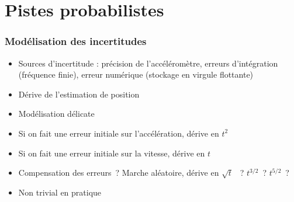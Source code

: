 \documentclass[11pt]{beamer}
\begin{document}
\section{Pistes probabilistes}
\begin{frame}
  \frametitle{Modélisation des incertitudes}
\begin{itemize}
\item Sources d'incertitude : précision de l'accéléromètre, erreurs
  d'intégration (fréquence finie), erreur numérique (stockage en
  virgule flottante)
\item Dérive de l'estimation de position
\item Modélisation délicate
\item Si on fait une erreur initiale sur l'accélération, dérive en
  $t^{2}$
\item Si on fait une erreur initiale sur la vitesse, dérive en
  $t$
\item Compensation des erreurs~? Marche aléatoire, dérive en $\sqrt t$
 ~? $t^{3/2}$~? $t^{5/2}$~?
\item Non trivial en pratique
\end{itemize}
\end{frame}
\end{document}
